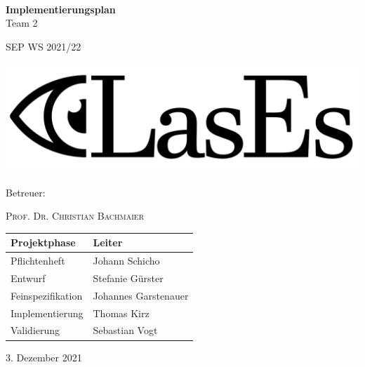 \documentclass[a4paper,11pt]{article}
\begin{document}
    \begin{titlepage}
        \centering

        $~$

        \vspace{0.2cm} %

        \Huge \textbf{Implementierungsplan}\\

        \Huge Team 2
        \Large

        SEP WS 2021/22

        \vspace{2cm}

        \includegraphics[width=0.8\linewidth]{graphics/LasEs-logo}

        \vspace{2cm}

        Betreuer:

        \textsc{Prof. Dr. Christian Bachmaier}

        \vspace{1cm}

        \begin{table}[H]
            \centering
            \Large
            \begin{tabular}{ll}
                \toprule
                \textbf{Projektphase} & \textbf{Leiter} \\
                \midrule
                Pflichtenheft & Johann Schicho \\
                Entwurf & Stefanie Gürster \\
                Feinspezifikation & Johannes Garstenauer \\
                Implementierung & Thomas Kirz \\
                Validierung & Sebastian Vogt \\
                \bottomrule
            \end{tabular}
        \end{table}

        \vspace{1cm}

        3. Dezember 2021

    \end{titlepage}
\end{document}

